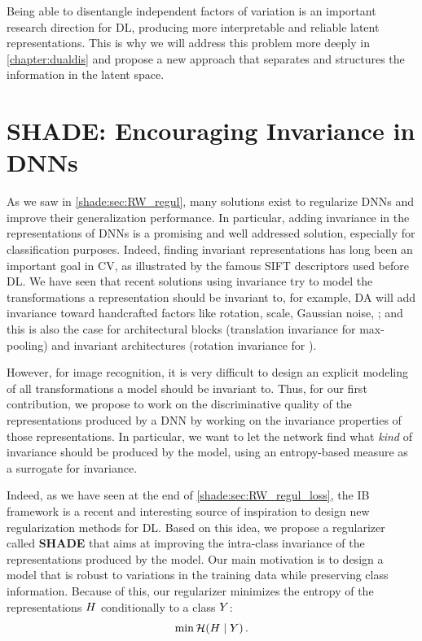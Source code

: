 Being able to disentangle independent factors of variation is an important research direction for \ac{DL}, producing more interpretable and reliable latent representations. This is why we will address this problem more deeply in \autoref{chapter:dualdis} and propose a new approach that separates and structures the information in the latent space.

\section{SHADE: Encouraging Invariance in DNNs} \label{shade:sec:model}

As we saw in \autoref{shade:sec:RW_regul}, many solutions exist to regularize \acp{DNN} and improve their generalization performance. In particular, adding invariance in the representations of \acp{DNN} is a promising and well addressed solution, especially for classification purposes.
%
Indeed, finding invariant representations has long been an important goal in \acf{CV}, as illustrated by the famous \acf{SIFT} descriptors used before \acf{DL}. 
%
We have seen that recent solutions using invariance try to model the transformations a representation should be invariant to, for example, \acf{DA} will add invariance toward handcrafted factors like rotation, scale, Gaussian noise, \etc; and this is also the case for architectural blocks (\eg translation invariance for max-pooling) and invariant architectures (\eg rotation invariance for \citep{dieleman2015rotation}).

However, for image recognition, it is very difficult to design an explicit modeling of all transformations a model should be invariant to.
%
Thus, for our first contribution, we propose to work on the discriminative quality of the representations produced by a \ac{DNN} by working on the invariance properties of those representations.
%
In particular, we want to let the network find what \textit{kind} of invariance should be produced by the model, using an entropy-based measure as a surrogate for invariance.

Indeed, as we have seen at the end of \autoref{shade:sec:RW_regul_loss}, the \acf{IB} framework is a recent and interesting source of inspiration to design new regularization methods for \ac{DL}. Based on this idea, we propose a regularizer called \textbf{\acf{SHADE}} that aims at improving the intra-class invariance of the representations produced by the model. Our main motivation is to design a model that is robust to variations in the training data while preserving class information. Because of this, our regularizer minimizes the entropy of the representations $H$ conditionally to a class $Y$:
\begin{equation}
    \min \mathcal{H}(H \mid Y)\,.
\end{equation}

